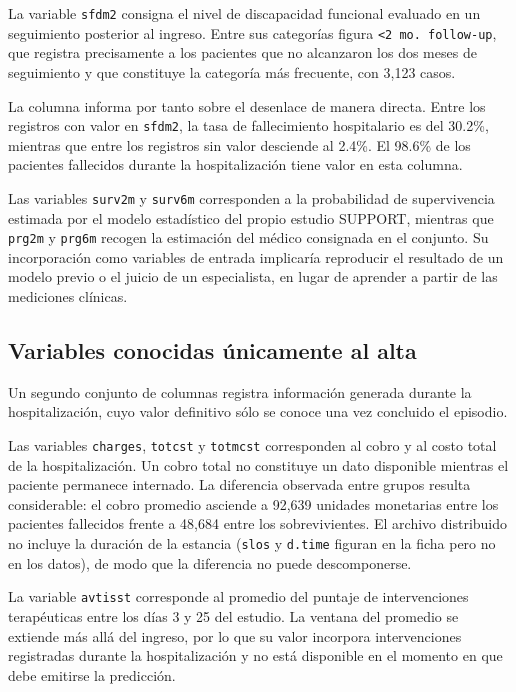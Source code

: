 \documentclass[11pt]{article}
\begin{document}
La variable \texttt{sfdm2} consigna el nivel de discapacidad funcional evaluado en un seguimiento
posterior al ingreso. Entre sus categorías figura \texttt{<2 mo. follow-up}, que registra
precisamente a los pacientes que no alcanzaron los dos meses de seguimiento y que constituye la
categoría más frecuente, con 3{,}123 casos.

La columna informa por tanto sobre el desenlace de manera directa. Entre los registros con valor
en \texttt{sfdm2}, la tasa de fallecimiento hospitalario es del 30.2\%, mientras que entre los
registros sin valor desciende al 2.4\%. El 98.6\% de los pacientes fallecidos durante la
hospitalización tiene valor en esta columna.

Las variables \texttt{surv2m} y \texttt{surv6m} corresponden a la probabilidad de supervivencia
estimada por el modelo estadístico del propio estudio SUPPORT, mientras que \texttt{prg2m} y
\texttt{prg6m} recogen la estimación del médico consignada en el conjunto. Su incorporación
como variables de entrada implicaría reproducir el resultado de un modelo previo o el juicio de un
especialista, en lugar de aprender a partir de las mediciones clínicas.

\subsection{Variables conocidas únicamente al alta}

Un segundo conjunto de columnas registra información generada durante la hospitalización, cuyo
valor definitivo sólo se conoce una vez concluido el episodio.

Las variables \texttt{charges}, \texttt{totcst} y \texttt{totmcst} corresponden al cobro y al
costo total de la hospitalización. Un cobro total no constituye un dato disponible mientras el
paciente permanece internado. La diferencia observada entre grupos resulta considerable: el cobro
promedio asciende a 92{,}639 unidades monetarias entre los pacientes fallecidos frente a 48{,}684
entre los sobrevivientes. El archivo distribuido no incluye la duración de la estancia
(\texttt{slos} y \texttt{d.time} figuran en la ficha pero no en los datos), de modo que la
diferencia no puede descomponerse.

La variable \texttt{avtisst} corresponde al promedio del puntaje de intervenciones terapéuticas
entre los días 3 y 25 del estudio. La ventana del promedio se extiende más allá del ingreso, por
lo que su valor incorpora intervenciones registradas durante la hospitalización y no está
disponible en el momento en que debe emitirse la predicción.
\end{document}

